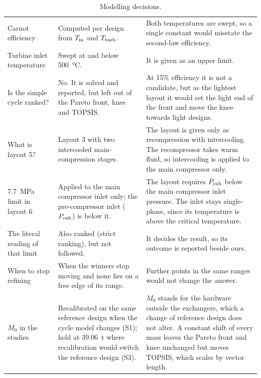 \begin{table}[!htbp]
\begin{tabularx}{\textwidth}{>{\raggedright\arraybackslash}p{3.3cm}>{\raggedright\arraybackslash}p{4.2cm}X}
Carnot efficiency & Computed per design from $T_\mathrm{in}$ and $T_\mathrm{turb}$. & Both temperatures are swept, so a single constant would misstate the second-law efficiency.\\
Turbine inlet temperature & Swept at and below \SI{500}{\celsius}. & It is given as an upper limit.\\
Is the simple cycle ranked? & No. It is solved and reported, but left out of the Pareto front, knee and TOPSIS. & At 15\% efficiency it is not a candidate, but as the lightest layout it would set the light end of the front and move the knee towards light designs.\\
What is layout 5? & Layout 3 with two intercooled main-compression stages. & The layout is given only as recompression with intercooling. The recompressor takes warm fluid, so intercooling is applied to the main compressor only.\\
\SI{7.7}{MPa} limit in layout 6 & Applied to the main compressor inlet only; the pre-compressor inlet ($P_\mathrm{exh}$) is below it. & The layout requires $P_\mathrm{exh}$ below the main compressor inlet pressure. The inlet stays single-phase, since its temperature is above the critical temperature.\\
The literal reading of that limit & Also ranked (strict ranking), but not followed. & It decides the result, so its outcome is reported beside ours.\\
When to stop refining & When the winners stop moving and none lies on a free edge of its range. & Further points in the same ranges would not change the answer.\\
$M_0$ in the studies & Recalibrated on the same reference design when the cycle model changes (S1); held at \SI{39.06}{t} where recalibration would switch the reference design (S3). & $M_0$ stands for the hardware outside the exchangers, which a change of reference design does not alter. A constant shift of every mass leaves the Pareto front and knee unchanged but moves TOPSIS, which scales by vector length.\\
\bottomrule
\end{tabularx}
\caption{Modelling decisions.}\label{tab:decisions}
\end{table}
